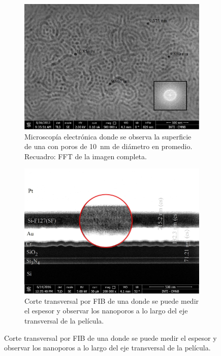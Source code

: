 				\begin{figure}[bh!]
		 	   	    \begin{subfigure}[t]{0.495\textwidth}
			        	\includegraphics[width=\textwidth]{Imagenes/Superficie-F127-medidas.jpg}
			       		\caption{Microscopía electrónica donde se observa la superficie de una \pdmF\space con poros de \SI{10}{nm} de diámetro en promedio. Recuadro: FFT de la imagen completa.}
			       		\label{fig:sem_homogeneidad1}
			       		\end{subfigure}
			       	\begin{subfigure}[t]{0.495\textwidth}
			 	   	    \includegraphics[width=\textwidth]{Imagenes/Perfil-F127.jpg}
			       		\caption{Corte transversal por FIB de una \pdmF\space donde se puede medir el espesor y observar los nanoporos a lo largo del eje transversal de la película.}

\end{subfigure}
\end{figure}
